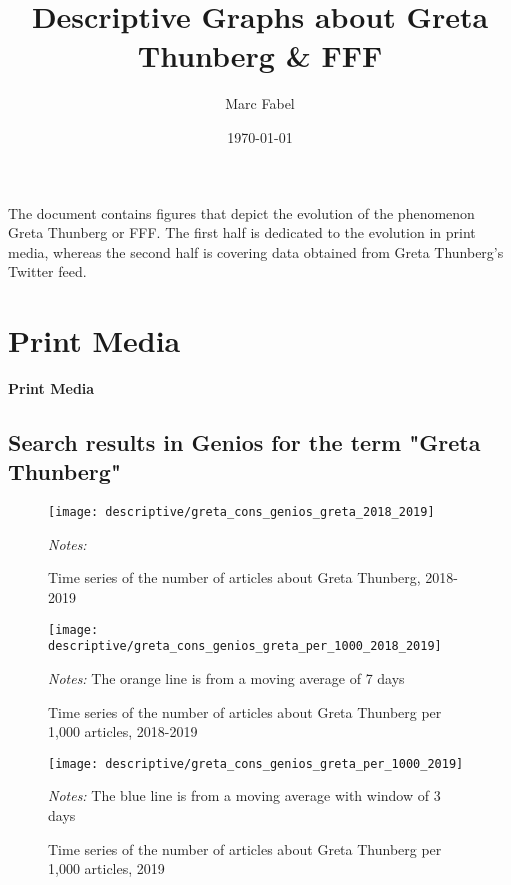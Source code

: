 \documentclass[11pt, a4paper]{article} %
\title{Descriptive Graphs about Greta Thunberg \& FFF}
\author{Marc Fabel}
\date{\monthyeardate\today}
\begin{document}
\maketitle
The document contains figures that depict the evolution of the phenomenon Greta Thunberg or FFF. The first half is dedicated to the evolution in print media, whereas the second half is covering data obtained from Greta Thunberg's Twitter feed.


\tableofcontents


\newpage
\TODO\section{Print Media}
\vspace*{\fill}
{\Huge \begin{center}\textbf{Print Media}\end{center}}
\vspace*{\fill}\clearpage


\subsection{Search results in Genios for the term "Greta Thunberg"}


\begin{figure}[H]\centering
	\caption{Time series of the number of articles about Greta Thunberg, 2018-2019}
	\texttt{[image: descriptive/greta\_cons\_genios\_greta\_2018\_2019]}
	\begin{minipage}{\linewidth}
		\scriptsize{\emph{Notes:} }
	\end{minipage}
\end{figure}
\begin{figure}[H]\centering
	\caption{Time series of the number of articles about Greta Thunberg per 1,000 articles, 2018-2019}
	\texttt{[image: descriptive/greta\_cons\_genios\_greta\_per\_1000\_2018\_2019]}
	\begin{minipage}{\linewidth}
		\scriptsize{\emph{Notes:} The orange line is from a moving average of 7 days}
	\end{minipage}
\end{figure}

\begin{figure}[H]\centering
	\caption{Time series of the number of articles about Greta Thunberg per 1,000 articles, 2019}
	\texttt{[image: descriptive/greta\_cons\_genios\_greta\_per\_1000\_2019]}
	\begin{minipage}{\linewidth}
		\scriptsize{\emph{Notes:} The blue line is from a moving average with window of 3 days}
	\end{minipage}
\end{figure}
\end{document}
